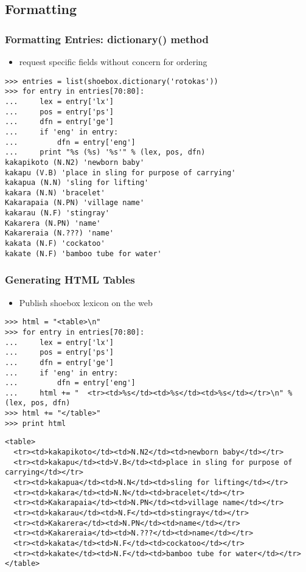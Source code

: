\documentclass{beamer}             %
\begin{document}
\subsection{Formatting}

\begin{frame}[fragile]
\frametitle{Formatting Entries: dictionary() method}

\begin{itemize}
\item request specific fields without concern for ordering
\end{itemize}
\scriptsize

\begin{verbatim}
>>> entries = list(shoebox.dictionary('rotokas'))
>>> for entry in entries[70:80]:
...     lex = entry['lx']
...     pos = entry['ps']
...     dfn = entry['ge']
...     if 'eng' in entry:
...         dfn = entry['eng']
...     print "%s (%s) '%s'" % (lex, pos, dfn)
kakapikoto (N.N2) 'newborn baby'
kakapu (V.B) 'place in sling for purpose of carrying'
kakapua (N.N) 'sling for lifting'
kakara (N.N) 'bracelet'
Kakarapaia (N.PN) 'village name'
kakarau (N.F) 'stingray'
Kakarera (N.PN) 'name'
Kakareraia (N.???) 'name'
kakata (N.F) 'cockatoo'
kakate (N.F) 'bamboo tube for water'
\end{verbatim}
\end{frame}

\begin{frame}[fragile]
\frametitle{Generating HTML Tables}

\begin{itemize}
\item Publish shoebox lexicon on the web
\end{itemize}
\scriptsize

\begin{verbatim}
>>> html = "<table>\n"
>>> for entry in entries[70:80]:
...     lex = entry['lx']
...     pos = entry['ps']
...     dfn = entry['ge']
...     if 'eng' in entry:
...         dfn = entry['eng']
...     html += "  <tr><td>%s</td><td>%s</td><td>%s</td></tr>\n" % (lex, pos, dfn)
>>> html += "</table>"
>>> print html
\end{verbatim}

\tiny

\begin{verbatim}
<table>
  <tr><td>kakapikoto</td><td>N.N2</td><td>newborn baby</td></tr>
  <tr><td>kakapu</td><td>V.B</td><td>place in sling for purpose of carrying</td></tr>
  <tr><td>kakapua</td><td>N.N</td><td>sling for lifting</td></tr>
  <tr><td>kakara</td><td>N.N</td><td>bracelet</td></tr>
  <tr><td>Kakarapaia</td><td>N.PN</td><td>village name</td></tr>
  <tr><td>kakarau</td><td>N.F</td><td>stingray</td></tr>
  <tr><td>Kakarera</td><td>N.PN</td><td>name</td></tr>
  <tr><td>Kakareraia</td><td>N.???</td><td>name</td></tr>
  <tr><td>kakata</td><td>N.F</td><td>cockatoo</td></tr>
  <tr><td>kakate</td><td>N.F</td><td>bamboo tube for water</td></tr>
</table>
\end{verbatim}
\end{frame}
\end{document}
